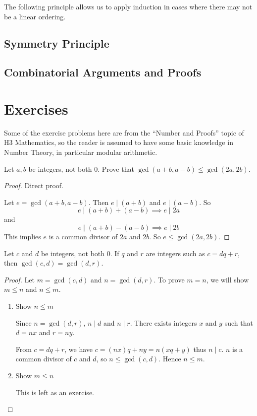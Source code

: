 The following principle allows us to apply induction in cases where there may not be a linear ordering.
\pagebreak

\subsection{Symmetry Principle}

\subsection{Combinatorial Arguments and Proofs}
\pagebreak

\section*{Exercises}
Some of the exercise problems here are from the ``Number and Proofs'' topic of H3 Mathematics, so the reader is assumed to have some basic knowledge in Number Theory, in particular modular arithmetic.

\begin{prbm}
Let $a,b$ be integers, not both $0$. Prove that $\gcd(a+b,a-b)\le\gcd(2a,2b)$.
\end{prbm}

\begin{proof}
Direct proof.

Let $e=\gcd(a+b,a-b)$. Then $e\mid(a+b)$ and $e\mid(a-b)$. So
\[ e\mid(a+b)+(a-b) \implies e\mid 2a \]
and
\[ e\mid(a+b)-(a-b) \implies e\mid 2b \]
This implies $e$ is a common divisor of $2a$ and $2b$. So $e\le\gcd(2a,2b)$.
\end{proof}

\begin{prbm}
Let $c$ and $d$ be integers, not both $0$. If $q$ and $r$ are integers such as $c=dq+r$, then $\gcd(c,d)=\gcd(d,r)$.
\end{prbm}

\begin{proof}
Let $m=\gcd(c,d)$ and $n=\gcd(d,r)$. To prove $m=n$, we will show $m\le n$ and $n\le m$.

\begin{enumerate}[label=(\roman*)]
\item Show $n\le m$

Since $n=\gcd(d,r)$, $n\mid d$ and $n\mid r$. There exists integers $x$ and $y$ such that $d=nx$ and $r=ny$.

From $c=dq+r$, we have $c=(nx)q+ny=n(xq+y)$ thus $n\mid c$. $n$ is a common divisor of $c$ and $d$, so $n\le\gcd(c,d)$. Hence $n\le m$.

\item Show $m\le n$

This is left as an exercise.
\end{enumerate}
\end{proof}

